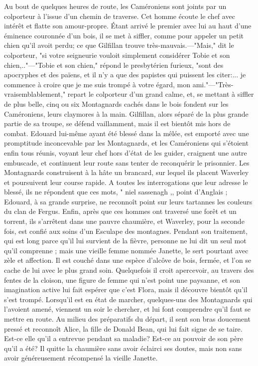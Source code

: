 {Au bout de quelques heures de route, les Caméroniens sont joints par un colporteur à l'issue d'un chemin de traverse. Cet homme écoute le chef avec intérêt et flatte son amour-propre. Étant arrivé le premier avec lui au haut d'une éminence couronnée d'un bois, il se met à siffler, comme pour appeler un petit chien qu'il avoit perdu; ce que Gilfillan trouve très-mauvais.—"Mais," dit le colporteur, "si votre seigneurie vouloit simplement considérer Tobie et son chien,.."—"Tobie et son chien," répond le presbytérien furieux, "sont des apocryphes et des païens, et il n'y a que des papistes qui puissent les citer:... je commence à croire que je me suis trompé à votre égard, mon ami."—"Très-vraisemblablement," repart le colporteur d'un grand calme, et, se mettant à siffler de plus belle, cinq ou six Montagnards cachés dans le bois fondent sur les Caméroniens, leurs claymores à la main. Gilfillan, alors séparé de la plus grande partie de sa troupe, se défend vaillamment, mais\setcounter{page}{219} il est bientôt mis hors de combat. Edouard lui-même ayant été blessé dans la mêlée, est emporté avec une promptitude inconcevable par les Montagnards, et les Caméroniens qui s'étoient enfin tous réunis, voyant leur chef hors d'état de les guider, craignent une autre embuscade, et continuent leur route sans tenter de reconquérir le prisonnier.
Les Montagnards construisent à la hâte un brancard, sur lequel ils placent Waverley et poursuivent leur course rapide. A toutes les interrogations que leur adresse le blessé, ils ne répondent que ces mots, " niel sassenagh ,, point d'Anglais ; Edouard, à sa grande surprise, ne reconnoît point sur leurs tartannes les couleurs du clan de Fergus. Enfin, après que ces hommes ont traversé une forêt et un torrent, ils s'arrêtent dans une pauvre chaumière, et Waverley, pour la seconde fois, est confié aux soins d'un Esculape des montagnes. Pendant son traitement, qui est long parce qu'il lui survient de la fièvre, personne ne lui dit un seul mot qu'il comprenne ; mais une vieille femme nommée Janette, le sert pourtant avec zèle et affection. Il est couché dans une espèce d'alcôve de bois, fermée, et l'on se cache de lui avec le plus grand soin. Quelquefois il croit\setcounter{page}{220} apercevoir, au travers des fentes de la cloison, une figure de femme qui n'est point une paysanne, et son imagination active lui fait espérer que c'est Flora, mais il découvre bientôt qu'il s'est trompé. Lorsqu'il est en état de marcher, quelques-uns des Montagnards qui l'avoient amené, viennent un soir le chercher, et lui font comprendre qu'il faut se mettre en route. Au milieu des préparatifs du départ, il sent son bras doucement pressé et reconnoît Alice, la fille de Donald Bean, qui lui fait signe de se taire. Est-ce elle qu'il a entrevue pendant sa maladie? Est-ce au pouvoir de son père qu'il a été? Il quitte la chaumière sans avoir éclairci ses doutes, mais non sans avoir généreusement récompensé la vieille Janette.
}
